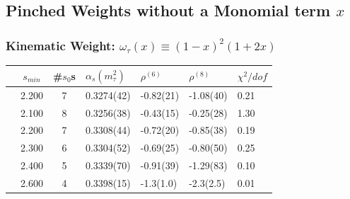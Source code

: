\documentclass[fleqn]{beamer}
\begin{document}
\subsection{Pinched Weights without a Monomial term \(x\)}
\begin{frame}
  \frametitle{Kinematic Weight: \(\omega_\tau(x) \equiv (1-x)^2(1+2x)\)}
  \begin{tabularx}{\textwidth}{cccYYYY}
    \toprule
    & \(s_{min}\) & \#\(s_0\)s & \(\alpha_s(m_\tau^2)\) & \(\rho^{(6)}\) & \(\rho^{(8)}\) & \(\chi^2/dof\)  \\
    \midrule
    \parbox[t]{2mm}{}
    & 2.200 & 7 & 0.3274(42) & -0.82(21) & -1.08(40) & 0.21 \\
    \midrule
    \parbox[t]{2mm}{}
    & 2.100 & 8 & 0.3256(38) & -0.43(15) & -0.25(28) & 1.30 \\
    & 2.200 & 7 & 0.3308(44) & -0.72(20) & -0.85(38) & 0.19 \\
    & 2.300 & 6 & 0.3304(52) & -0.69(25) & -0.80(50) & 0.25 \\
    & 2.400 & 5 & 0.3339(70) & -0.91(39) & -1.29(83) & 0.10 \\
    & 2.600 & 4 & 0.3398(15) & -1.3(1.0) & -2.3(2.5) & 0.01  \\
    \bottomrule
  \end{tabularx}
\end{frame}
\end{document}
